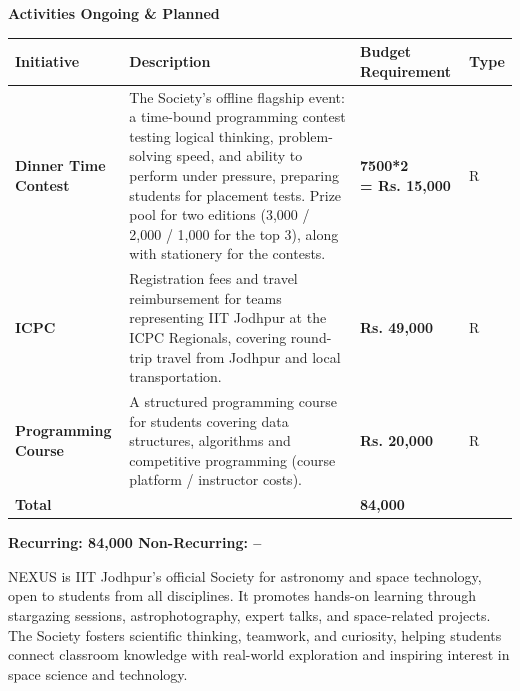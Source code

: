 \documentclass[11pt,letterpaper]{article}
\newcommand{\rs}{{\rupee}}
\newcommand{\society}[1]{\par\bigskip{\sffamily\bfseries\large #1}\par}
\newcommand{\subhead}[1]{\par{\bfseries #1}\par}
\begin{document}
\subhead{Activities Ongoing \& Planned}
\begin{longtable}{|C{0.25\textwidth}|C{0.40\textwidth}|C{0.17\textwidth}|C{0.06\textwidth}|}
\hline
\textbf{Initiative} & \textbf{Description} & \textbf{Budget Requirement} & \textbf{Type}\\ \hline
\textbf{Dinner Time Contest} & The Society's offline flagship event: a time-bound programming contest testing logical thinking, problem-solving speed, and ability to perform under pressure, preparing students for placement tests. Prize pool for two editions (\rs3,000 / \rs2,000 / \rs1,000 for the top 3), along with stationery for the contests. & \textbf{7500*2\newline = Rs. 15,000} & R\\ \hline
\textbf{ICPC} & Registration fees and travel reimbursement for teams representing IIT Jodhpur at the ICPC Regionals, covering round-trip travel from Jodhpur and local transportation. & \textbf{Rs. 49,000} & R\\ \hline
\textbf{Programming Course} & A structured programming course for students covering data structures, algorithms and competitive programming (course platform / instructor costs). & \textbf{Rs. 20,000} & R\\ \hline
\textbf{Total} & & \textbf{\rs84,000} & \\ \hline
\end{longtable}

\textbf{Recurring: \rs84,000 \quad Non-Recurring: --}

\clearpage
\society{8.\ \ Nexus}

NEXUS is IIT Jodhpur's official Society for astronomy and space technology, open to students from all disciplines. It promotes hands-on learning through stargazing sessions, astrophotography, expert talks, and space-related projects. The Society fosters scientific thinking, teamwork, and curiosity, helping students connect classroom knowledge with real-world exploration and inspiring interest in space science and technology.
\end{document}
